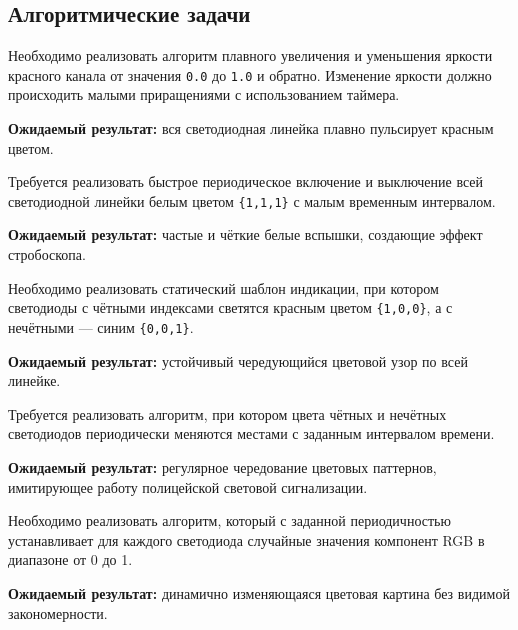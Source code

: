 \subsection{Алгоритмические задачи}

\begin{taskbox}
\indent Необходимо реализовать алгоритм плавного увеличения и уменьшения яркости красного канала от значения \verb|0.0| до \verb|1.0| и обратно. Изменение яркости должно происходить малыми приращениями с использованием таймера.

\noindent\textbf{Ожидаемый результат:} вся светодиодная линейка плавно пульсирует красным цветом.
\end{taskbox}

\begin{taskbox}
\indent Требуется реализовать быстрое периодическое включение и выключение всей светодиодной линейки белым цветом \verb|{1,1,1}| с малым временным интервалом.

\noindent\textbf{Ожидаемый результат:} частые и чёткие белые вспышки, создающие эффект стробоскопа.
\end{taskbox}

\begin{taskbox}
\indent Необходимо реализовать статический шаблон индикации, при котором светодиоды с чётными индексами светятся красным цветом \verb|{1,0,0}|, а с нечётными — синим \verb|{0,0,1}|.

\noindent\textbf{Ожидаемый результат:} устойчивый чередующийся цветовой узор по всей линейке.
\end{taskbox}

\begin{taskbox}
\indent Требуется реализовать алгоритм, при котором цвета чётных и нечётных светодиодов периодически меняются местами с заданным интервалом времени.

\noindent\textbf{Ожидаемый результат:} регулярное чередование цветовых паттернов, имитирующее работу полицейской световой сигнализации.
\end{taskbox}

\begin{taskbox}
\indent Необходимо реализовать алгоритм, который с заданной периодичностью устанавливает для каждого светодиода случайные значения компонент RGB в диапазоне от 0 до 1.

\noindent\textbf{Ожидаемый результат:} динамично изменяющаяся цветовая картина без видимой закономерности.
\end{taskbox}
